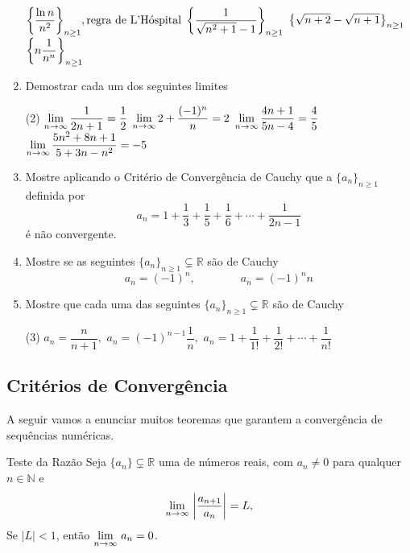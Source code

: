 \begin{enumerate}[label=\rm{(\arabic*)}]
\begin{tasks}[label=\rm{(\alph*)},item-indent=4em,label-width=4ex,ref=\rm{(\alph*)}]
\task  \(\displaystyle{\left\{\frac{\ln n}{n^2}\right\}_{n\geq 1}}, \text{regra de L'H\'{o}spital}\)
\task  \(\displaystyle{\left\{\frac{1}{\sqrt{n^2+1}-1}\right\}_{n\geq 1}}\)
\task  \(\displaystyle{\left\{\sqrt{n+2}-\sqrt{n+1}\right\}_{n\geq 1}}\)
\task  \(\displaystyle{\left\{n\frac{1}{n^n}\right\}_{n\geq 1}} \)
\end{tasks}
\item Demostrar cada um dos seguintes limites
\begin{tasks}[label=\rm{(\alph*)},item-indent=4em,label-width=4ex,ref=\rm{(\alph*)}](2)
\task \(\displaystyle \lim_{n\to\infty}\dfrac{1}{2n+1}=\dfrac{1}{2}\)
\task \(\displaystyle \lim_{n\to\infty}2+\dfrac{(-1)^{n}}{n}=2\)
\task \(\displaystyle \lim_{n\to\infty}\dfrac{4n+1}{5n-4}=\dfrac{4}{5}\)
\task \(\displaystyle \lim_{n\to\infty}\dfrac{5n^2+8n+1}{5+3n-n^2}=-5\)
\end{tasks}
\item Mostre aplicando o Crit\'{e}rio de Converg\^{e}ncia de Cauchy que a
\seq $\{a_n\}_{n\geq 1}$ definida por
\begin{equation*}
  a_n=1+\frac{1}{3}+\frac{1}{5}+\frac{1}{6}+\cdots+\frac{1}{2n-1}
\end{equation*}
\'{e} n\~{a}o convergente.
\item Mostre se as seguintes \seqs $\{a_n\}_{n\geq 1}\subsetneq \mathbb{R}$ s\~{a}o de Cauchy
\begin{equation*}
  a_n=(-1)^n,\qquad \qquad  a_n=(-1)^n n
\end{equation*}

\item Mostre que cada uma das seguintes \seqs $\{a_n\}_{n\geq 1}\subsetneq \mathbb{R}$ s\~{a}o de
Cauchy
\begin{tasks}[label=\rm{(\alph*)},item-indent=4em,label-width=4ex,ref=\rm{(\alph*)}](3)
\task  \(a_n=\dfrac{n}{n+1},\)
\task  \(a_n=(-1)^{n-1}\dfrac{1}{n},\)
\task  \(a_n=1+\dfrac{1}{1!}+\dfrac{1}{2!}+\cdots+\dfrac{1}{n!}\)
\end{tasks}
\end{enumerate}

\subsection{Crit\'{e}rios de Converg\^{e}ncia}
A seguir vamos a enunciar muitos teoremas que garantem a
converg\^{e}ncia de sequ\^{e}ncias num\'{e}ricas.

\begin{theoc}{Teste da Raz\~{a}o}{}
Seja $\{a_{n}\}\subsetneq \mathbb{R}$  uma \seq de n\'{u}meros reais, com $a_n\neq 0$ para qualquer $n\in \mathbb{N}$ e
\begin{equation*}
 \displaystyle{\lim_{n\to \infty}\,{\left|\frac{a_{n+1}}{a_{n}}\right|}_{}}=L,
\end{equation*}
Se  $|L|<1$, ent\~{a}o  $\displaystyle{\lim_{n\to \infty}\,{a}_{n}}=0$.
\end{theoc}

